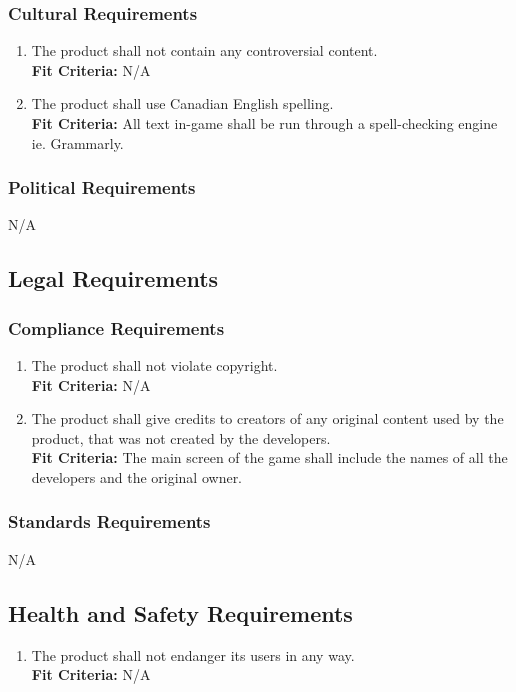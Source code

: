 \documentclass[12pt, titlepage]{article}
\begin{document}
\subsubsection{Cultural Requirements}
\begin{enumerate}[{CR}1. ]
    \item The product shall not contain any controversial content.\\
    \textbf{Fit Criteria:} N/A
    \item The product shall use Canadian English spelling.\\
    \textbf{Fit Criteria:} All text in-game shall be run through a spell-checking engine ie. Grammarly.
\end{enumerate}

\subsubsection{Political Requirements}
N/A



\subsection{Legal Requirements}

\subsubsection{Compliance Requirements}
\begin{enumerate}[{LR}1. ]
    \item The product shall not violate copyright.\\
    \textbf{Fit Criteria:} N/A
    \item The product shall give credits to creators of any original content used by the product, that was not created by the developers.\\
    \textbf{Fit Criteria:} The main screen of the game shall include the names of all the developers and the original owner.
\end{enumerate}

\subsubsection{Standards Requirements}
N/A



\subsection{Health and Safety Requirements}
\begin{enumerate}[{HS}1. ]
    \item The product shall not endanger its users in any way.\\
    \textbf{Fit Criteria:} N/A
\end{enumerate}
\end{document}
